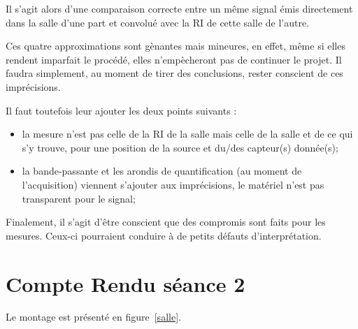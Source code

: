 \documentclass[12pt]{article}
\begin{document}
Il s'agit alors d'une comparaison correcte entre un même signal émis directement dans la salle d'une part et convolué
avec la RI de cette salle de l'autre.

Ces quatre approximations sont gènantes mais mineures, en effet, même si elles rendent imparfait le procédé, elles
n'empècheront pas de continuer le projet. Il faudra simplement, au moment de tirer des conclusions, rester conscient de
ces imprécisions.


Il faut toutefois leur ajouter les deux points suivants :

\begin{itemize}
    \item la mesure n'est pas celle de la RI de la salle mais celle de la salle et de ce qui s'y trouve, pour une position de la
        source et du/des capteur(s) donnée(s);
    \item la bande-passante et les arondis de quantification (au moment de l'acquisition) viennent s'ajouter aux
        imprécisions, le matériel n'est pas transparent pour le signal;
\end{itemize}

Finalement, il s'agit d'être conscient que des compromis sont faits pour les mesures. Ceux-ci pourraient conduire à de
petits défauts d'interprétation.

\section{Compte Rendu séance 2} %

Le montage est présenté en figure~\ref{salle}.
\end{document}

